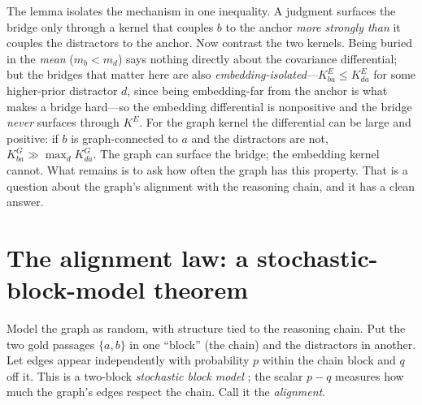 \documentclass[11pt]{article}
\theoremstyle{plain}
\theoremstyle{definition}
\theoremstyle{remark}
\begin{document}
The lemma isolates the mechanism in one inequality. A judgment surfaces the bridge only through a kernel that
couples $b$ to the anchor \emph{more strongly than} it couples the distractors to the anchor. Now contrast the two
kernels. Being buried in the \emph{mean} ($m_b<m_d$) says nothing directly about the covariance differential; but
the bridges that matter here are also \emph{embedding-isolated}---$K^E_{ba}\le K^E_{da}$ for some higher-prior
distractor $d$, since being embedding-far from the anchor is what makes a bridge hard---so the embedding
differential is nonpositive and the bridge \emph{never} surfaces through $K^E$. For the graph kernel the differential can be large and positive:
if $b$ is graph-connected to $a$ and the distractors are not, $K^G_{ba}\gg\max_d K^G_{da}$. The graph can surface
the bridge; the embedding kernel cannot. What remains is to ask how often the graph has this property. That is a
question about the graph's alignment with the reasoning chain, and it has a clean answer.

\section{The alignment law: a stochastic-block-model theorem}\label{sec:law}
Model the graph as random, with structure tied to the reasoning chain. Put the two gold passages $\{a,b\}$ in one
``block'' (the chain) and the distractors in another. Let edges appear independently with probability $p$ within the
chain block and $q$ off it. This is a two-block \emph{stochastic block model} \citep{holland1983sbm}; the scalar
$p-q$ measures how much the graph's edges respect the chain. Call it the \emph{alignment}.
\end{document}
